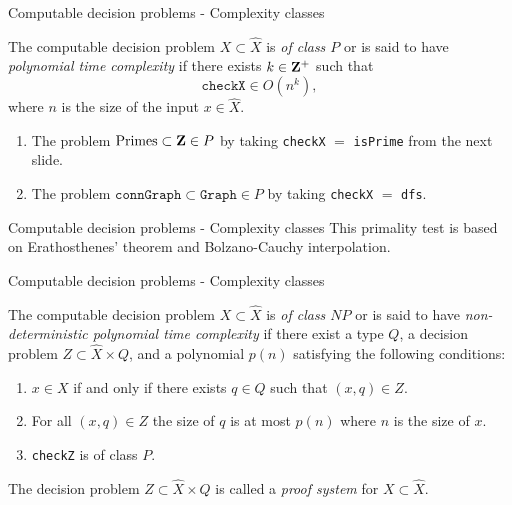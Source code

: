 \begin{frame}{Computable decision problems - Complexity classes}
	\begin{defn}
		The computable decision problem $X \subset \hat{X}$ is
		\emph{of class $P$} or is said to have \emph{polynomial time complexity}
		if there exists $k \in \mathbf{Z}^+$ such that
		\[
			\mathtt{checkX} \in O(n^k),
		\]
		where $n$ is the size of the input $x \in \hat{X}$.
	\end{defn}

	\pause
	\begin{exl}
		\begin{enumerate}
			\item The problem
				\(
					\text{Primes} \subset \mathbf{Z} \in P
				\)
				by taking \texttt{checkX} $=$ \texttt{isPrime} from the
				next slide.
			\item The problem 
				\(
					\mathtt{connGraph} \subset \mathtt{Graph} \in P
				\)
				by taking \texttt{checkX} $=$ \texttt{dfs}.
		\end{enumerate}
	\end{exl}
\end{frame}

%

\begin{frame}{Computable decision problems - Complexity classes}
	This primality test is based on Erathosthenes' theorem and Bolzano-Cauchy
	interpolation.

	\bigskip
	
\end{frame}

%

\begin{frame}{Computable decision problems - Complexity classes}
	\begin{defn}
		The computable decision problem $X \subset \hat{X}$ is
		\emph{of class $NP$} or is said to have
		\emph{non-deterministic polynomial time complexity} if there exist
		a type $Q$, a decision problem $Z \subset \hat{X} \times Q$, and a
		polynomial $p(n)$ satisfying the following conditions:
		\begin{enumerate}
			\item $x \in X$ if and only if there exists $q \in Q$ such that
				$(x, q) \in Z$.
			\item For all $(x, q) \in Z$ the size of $q$ is at most $p(n)$
				where $n$ is the size of $x$.
			\item \texttt{checkZ} is of class $P$.
		\end{enumerate}

		The decision problem $Z \subset \hat{X} \times Q$ is called a
		\emph{proof system} for $X \subset \hat{X}$.
	\end{defn}
\end{frame}

